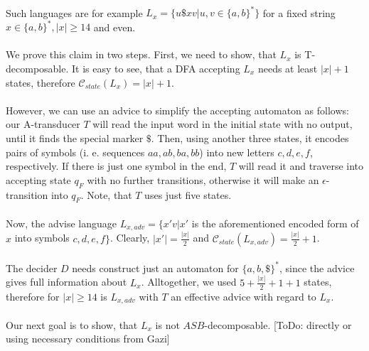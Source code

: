 \documentclass[12pt,oneside,a4paper]{book}
\begin{document}
\paragraph{}
\dokaz Such languages are for example $L_{x} = \{ u\$ xv | u,v \in \{ a,b\}^* \}$ for a fixed string $x \in \{ a,b\}^*, |x| \geq 14$ and even.

\paragraph{}
We prove this claim in two steps. First, we need to show, that $L_{x}$ is T-decomposable. It is easy to see, that  a DFA accepting $L_{x}$ needs at least $|x| + 1$ states, therefore $\mathscr{C}_{state}(L_x) = |x|+1$.

\paragraph{}
However, we can use an advice to simplify the accepting automaton as follows: our A-transducer $T$ will read the input word in the initial state with no output, until it finds the special marker $\$ $. Then, using another three states, it encodes pairs of symbols (i. e. sequences $aa, ab, ba, bb$) into new letters $c, d, e, f$, respectively. If there is just one symbol in the end, $T$ will read it and traverse into accepting state $q_F$ with no further transitions, otherwise it will make an $\epsilon $-transition into $q_{F}$. Note, that $T$ uses just five states.

\paragraph{}
Now, the advise language $L_{x,adv} = \{ x'v | x'$ is the aforementioned encoded form of $x$ into symbols $c,d,e,f \}$. Clearly, $|x'| = \frac{|x|}{2}$ and $\mathscr{C}_{state}(L_{x,adv}) = \frac{|x|}{2}+1$.

\paragraph{}
The decider $D$ needs construct just an automaton for $\{a,b,\$\}^*$, since the advice gives full information about $L_x$. Alltogether, we used $5 + \frac{|x|}{2}+1+1$ states, therefore for $|x| \geq 14$ is $L_{x,adv}$ with $T$ an effective advice with regard to $L_x$.

\paragraph{}
Our next goal is to show, that $L_x$ is not $ASB$-decomposable. \color{red}[ToDo: directly or using necessary conditions from Gazi]\color{black}
\square
\end{document}
